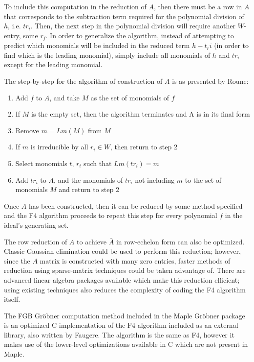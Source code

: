 \documentclass[letterpaper,12pt,titlepage,oneside,final]{book}
\begin{document}
To include this computation in the reduction of ${A}$, then there must be a row in ${A}$ that corresponds to the subtraction term required for the polynomial division of ${h}$, i.e. ${tr_i}$.  Then, the next step in the polynomial division will require another ${W}$-entry, some ${r_j}$.  In order to generalize the algorithm, instead of attempting to predict which monomials will be included in the reduced term ${h - t_ri}$ (in order to find which is the leading monomial), simply include all monomials of ${h}$ and ${tr_i}$ except for the leading monomial.

The step-by-step for the algorithm of construction of ${A}$ is as presented by Roune:
\begin{enumerate}
  \item Add ${f}$ to ${A}$, and take ${M}$ as the set of monomials of ${f}$
  \item If ${M}$ is the empty set, then the algorithm terminates and A is in its final form
  \item Remove $m = {Lm(M)}$ from ${M}$
  \item If ${m}$ is irreducible by all ${r_i \in W}$, then return to step 2
  \item Select monomials ${t,\, r_i}$ such that ${Lm(tr_i) = m}$
  \item Add ${tr_i}$ to ${A}$, and the monomials of ${tr_i}$ not including ${m}$ to the set of monomials ${M}$ and return to step 2
\end{enumerate}

Once ${A}$ has been constructed, then it can be reduced by some method specified and the F4 algorithm proceeds to repeat this step for every polynomial ${f}$ in the ideal's generating set.

The row reduction of ${A}$ to achieve ${\bar A}$ in row-echelon form can also be optimized.  Classic Gaussian elimination could be used to perform this reduction; however, since the ${A}$ matrix is constructed with many zero entries, faster methods of reduction using sparse-matrix techniques could be taken advantage of.  There are advanced linear algebra packages available which make this reduction efficient; using existing techniques also reduces the complexity of coding the F4 algorithm itself.

The FGB Gr\"obner computation method included in the Maple Gr\"obner package is an optimized C implementation of the F4 algorithm included as an external library, also written by Faugere.  The algorithm is the same as F4, however it makes use of the lower-level optimizations available in C which are not present in Maple. 
\end{document}
